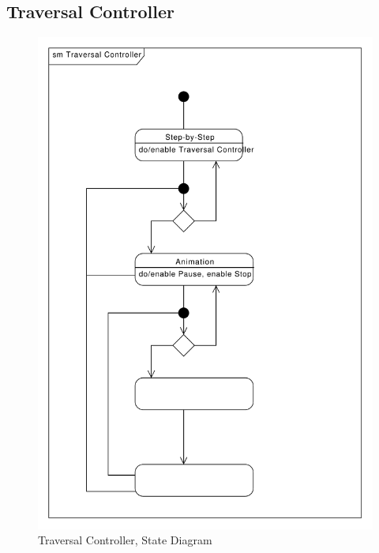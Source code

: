 \subsection{Traversal Controller}
\begin{figure}[p]
    \centering
    \includegraphics[width=\textwidth]{diagrams/sm-traversal-controller.pdf}
    \caption{Traversal Controller, State Diagram}
    \label{fig:sm-traversal-controller}
\end{figure}